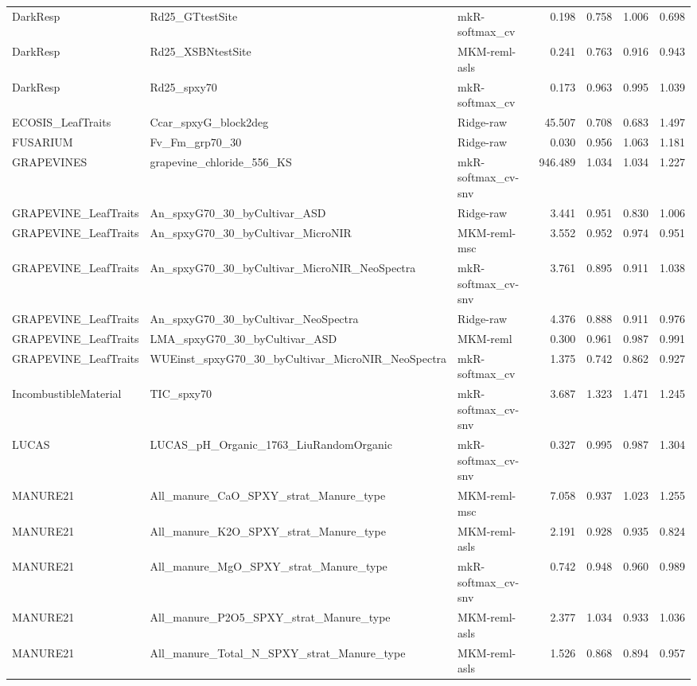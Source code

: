 \begin{tabular}{lllrrrr}
DarkResp & Rd25_GTtestSite & mkR-softmax_cv & 0.198 & 0.758 & 1.006 & 0.698 \\
DarkResp & Rd25_XSBNtestSite & MKM-reml-asls & 0.241 & 0.763 & 0.916 & 0.943 \\
DarkResp & Rd25_spxy70 & mkR-softmax_cv & 0.173 & 0.963 & 0.995 & 1.039 \\
ECOSIS_LeafTraits & Ccar_spxyG_block2deg & Ridge-raw & 45.507 & 0.708 & 0.683 & 1.497 \\
FUSARIUM & Fv_Fm_grp70_30 & Ridge-raw & 0.030 & 0.956 & 1.063 & 1.181 \\
GRAPEVINES & grapevine_chloride_556_KS & mkR-softmax_cv-snv & 946.489 & 1.034 & 1.034 & 1.227 \\
GRAPEVINE_LeafTraits & An_spxyG70_30_byCultivar_ASD & Ridge-raw & 3.441 & 0.951 & 0.830 & 1.006 \\
GRAPEVINE_LeafTraits & An_spxyG70_30_byCultivar_MicroNIR & MKM-reml-msc & 3.552 & 0.952 & 0.974 & 0.951 \\
GRAPEVINE_LeafTraits & An_spxyG70_30_byCultivar_MicroNIR_NeoSpectra & mkR-softmax_cv-snv & 3.761 & 0.895 & 0.911 & 1.038 \\
GRAPEVINE_LeafTraits & An_spxyG70_30_byCultivar_NeoSpectra & Ridge-raw & 4.376 & 0.888 & 0.911 & 0.976 \\
GRAPEVINE_LeafTraits & LMA_spxyG70_30_byCultivar_ASD & MKM-reml & 0.300 & 0.961 & 0.987 & 0.991 \\
GRAPEVINE_LeafTraits & WUEinst_spxyG70_30_byCultivar_MicroNIR_NeoSpectra & mkR-softmax_cv & 1.375 & 0.742 & 0.862 & 0.927 \\
IncombustibleMaterial & TIC_spxy70 & mkR-softmax_cv-snv & 3.687 & 1.323 & 1.471 & 1.245 \\
LUCAS & LUCAS_pH_Organic_1763_LiuRandomOrganic & mkR-softmax_cv-snv & 0.327 & 0.995 & 0.987 & 1.304 \\
MANURE21 & All_manure_CaO_SPXY_strat_Manure_type & MKM-reml-msc & 7.058 & 0.937 & 1.023 & 1.255 \\
MANURE21 & All_manure_K2O_SPXY_strat_Manure_type & MKM-reml-asls & 2.191 & 0.928 & 0.935 & 0.824 \\
MANURE21 & All_manure_MgO_SPXY_strat_Manure_type & mkR-softmax_cv-snv & 0.742 & 0.948 & 0.960 & 0.989 \\
MANURE21 & All_manure_P2O5_SPXY_strat_Manure_type & MKM-reml-asls & 2.377 & 1.034 & 0.933 & 1.036 \\
MANURE21 & All_manure_Total_N_SPXY_strat_Manure_type & MKM-reml-asls & 1.526 & 0.868 & 0.894 & 0.957 \\

\end{tabular}
